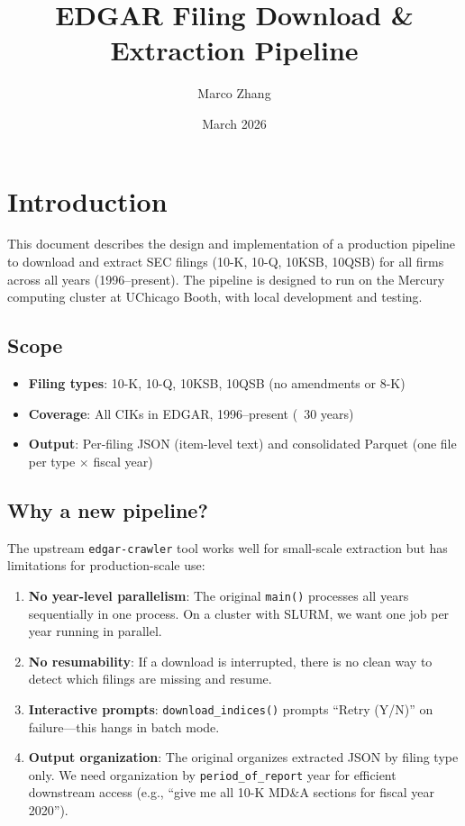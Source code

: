\documentclass[11pt]{article}
\title{EDGAR Filing Download \& Extraction Pipeline}
\author{Marco Zhang}
\date{March 2026}
\begin{document}
\maketitle

\section{Introduction}

This document describes the design and implementation of a production pipeline to download and extract SEC filings (10-K, 10-Q, 10KSB, 10QSB) for all firms across all years (1996--present). The pipeline is designed to run on the Mercury computing cluster at UChicago Booth, with local development and testing.

\subsection*{Scope}

\begin{itemize}
  \item \textbf{Filing types}: 10-K, 10-Q, 10KSB, 10QSB (no amendments or 8-K)
  \item \textbf{Coverage}: All CIKs in EDGAR, 1996--present (~30 years)
  \item \textbf{Output}: Per-filing JSON (item-level text) and consolidated Parquet (one file per type $\times$ fiscal year)
\end{itemize}

\subsection*{Why a new pipeline?}

The upstream \texttt{edgar-crawler} tool works well for small-scale extraction but has limitations for production-scale use:

\begin{enumerate}
  \item \textbf{No year-level parallelism}: The original \texttt{main()} processes all years sequentially in one process. On a cluster with SLURM, we want one job per year running in parallel.
  \item \textbf{No resumability}: If a download is interrupted, there is no clean way to detect which filings are missing and resume.
  \item \textbf{Interactive prompts}: \texttt{download\_indices()} prompts ``Retry (Y/N)'' on failure---this hangs in batch mode.
  \item \textbf{Output organization}: The original organizes extracted JSON by filing type only. We need organization by \texttt{period\_of\_report} year for efficient downstream access (e.g., ``give me all 10-K MD\&A sections for fiscal year 2020'').
\end{enumerate}
\end{document}

